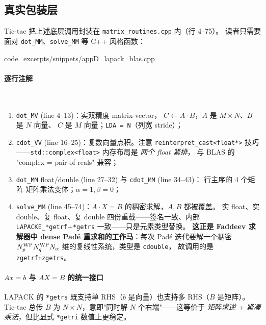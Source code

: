 \subsection{真实包装层}

Tic-tac 把上述底层调用封装在 \texttt{matrix\_routines.cpp} 内（行 4--75）。
读者只需要面对 \texttt{dot\_MM}、\texttt{solve\_MM} 等 C++ 风格函数：


{code_excerpts/snippets/appD_lapack_blas.cpp}

\paragraph{逐行注解}\

\begin{enumerate}
\item \texttt{dot\_MV} (line 4--13)：实双精度 matrix-vector，
      $C\leftarrow A\cdot B$，$A$ 是 $M\times N$、$B$ 是 $N$ 向量、
      $C$ 是 $M$ 向量；\texttt{LDA = N}（列宽 stride）；
\item \texttt{cdot\_VV} (line 16--25)：复数向量点积。注意 \texttt{reinterpret\_cast<float*>}
      技巧——\texttt{std::complex<float>} 内存布局是 \emph{两个 float 紧排}，
      与 BLAS 的 "complex = pair of reals" 兼容；
\item \texttt{dot\_MM} float/double (line 27--32) 与 \texttt{cdot\_MM} (line 34--43)：
      行主序的 4 个矩阵-矩阵乘法变体；$\alpha=1, \beta=0$；
\item \texttt{solve\_MM} (line 45--74)：$A\cdot X=B$ 的稠密求解，$A,B$ 都被覆盖。
      实 float、实 double、复 float、复 double 四份重载——签名一致、内部
      \texttt{LAPACKE\_*getrf}+\texttt{*getrs} 一致——只是元素类型替换。
      \textbf{这正是 Faddeev 求解器中 dense Padé 重求和的工作马}：每次 Padé
      迭代要解一个稠密 ${N_{p}^{\text{WP}}}{N_{q}^{\text{WP}}}N_\alpha$ 维的复线性系统，类型是 \texttt{cdouble}，
      故调用的是 \texttt{zgetrf+zgetrs}。
\end{enumerate}

\paragraph{$A x = b$ 与 $A X = B$ 的统一接口}
LAPACK 的 \texttt{*getrs} 既支持单 RHS（$b$ 是向量）也支持多 RHS（$B$ 是矩阵）。
Tic-tac 总传 $B$ 为 $N\times N$，意即"同时解 $N$ 个右端"——这等价于
\emph{矩阵求逆 + 紧凑乘法}，但比显式 \texttt{*getri} 数值上更稳定。

